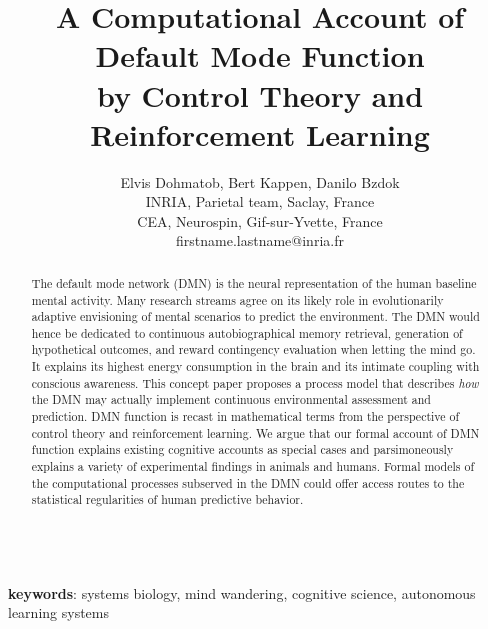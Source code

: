 \documentclass{article} %
\title{A Computational Account of Default Mode Function\\
by Control Theory and Reinforcement Learning}
\begin{document}
\author{Elvis Dohmatob, Bert Kappen, Danilo Bzdok\\
  INRIA, Parietal team, Saclay, France\\
  CEA, Neurospin, Gif-sur-Yvette, France\\
  firstname.lastname@inria.fr}

\maketitle


\begin{abstract}
The default mode network (DMN) is the neural representation of the human
baseline mental activity.
%
Many research streams agree on its likely role in evolutionarily adaptive
envisioning of mental scenarios to predict the environment.
The DMN would hence be dedicated to continuous autobiographical memory retrieval,
generation of hypothetical outcomes,
and reward contingency evaluation when letting the mind go.
It explains its highest energy consumption in the brain and
its intimate coupling with conscious awareness.
%
This concept paper proposes a process model that describes
\textit{how} the DMN may actually implement continuous
environmental assessment and prediction.
DMN function is recast in mathematical terms
from the perspective of control theory and
reinforcement learning.
We argue that our formal account of DMN function
explains existing cognitive accounts as special cases and
parsimoneously explains a variety of experimental findings
in animals and humans.
%
Formal models of the computational processes subserved in the DMN
could offer access routes to the statistical regularities
of human predictive behavior.
\end{abstract}

\textbf{\\keywords}: systems biology, mind wandering, cognitive science,
autonomous learning systems

\tableofcontents
\end{document}
